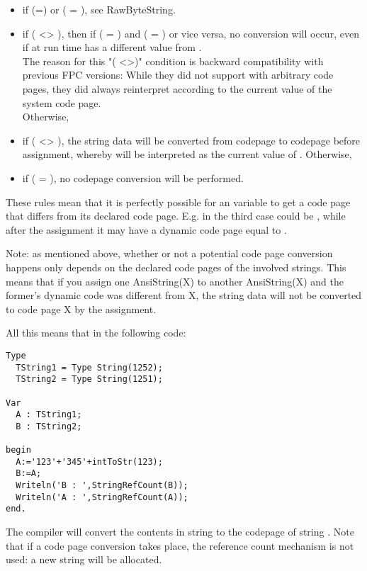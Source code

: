 \begin{itemize}
\item if (=) or ( =
), see RawByteString.
\item if ( <> ), then if ( =
) and ( = ) or vice versa, no conversion will
occur, even if at run time  has a different value from 
. \\
The reason for this "( <>)"  condition is backward compatibility with previous FPC versions:
While they did not support  with arbitrary code pages, they did
always reinterpret  according to the current value of the system
code page. \\
Otherwise,
\item if ( <> ), the string data will be converted from
codepage  to codepage   before assignment, whereby
 will be
interpreted as the current value of . Otherwise,
\item if ( = ), no codepage conversion will be performed.
\end{itemize}
These rules mean that it is perfectly possible for an  variable to
get a code page that differs from its declared code page. 
E.g. in the third case  could be , while after the 
assignment it may have a dynamic code page equal to .

Note: as mentioned above, whether or not a potential code page conversion
happens only depends on the declared code pages of the involved strings. 
This means that if you assign one AnsiString(X) to another AnsiString(X) and the
former's dynamic code was different from X, the string data will not be
converted to code page X by the assignment. 

All this means that in the following code:
\begin{verbatim}
Type
  TString1 = Type String(1252);
  TString2 = Type String(1251);

Var
  A : TString1;
  B : TString2;
  
begin
  A:='123'+'345'+intToStr(123);
  B:=A;
  Writeln('B : ',StringRefCount(B));
  Writeln('A : ',StringRefCount(A));
end.
\end{verbatim}
The compiler will convert the contents in string  to the codepage of string .
Note that if a code page conversion takes place, the reference count mechanism is not used: 
a new string will be allocated.

